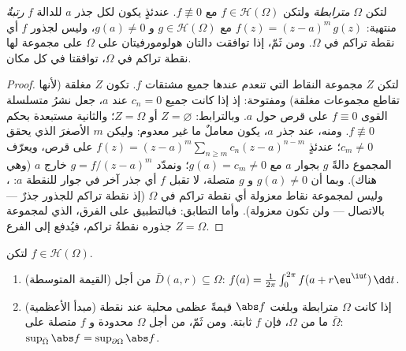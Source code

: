 \begin{theorem}
\label{thm:b3:holomorphic:identity}
لتكن $\Omega$ \emph{مترابطة} ولتكن $f \in \mathcal
H(\Omega)$ مع
$f \not\equiv 0$. عندئذٍ يكون لكل جذر $a$ للدالة $f$
\emph{رتبةٌ} منتهية: $f(z) = (z - a)^m\,g(z)$ مع $g \in
\mathcal H(\Omega)$ و $g(a) \neq 0$، وليس
لجذور $f$ أي نقطة تراكم في $\Omega$. ومن ثَمّ، إذا توافقت
دالتان هولومورفيتان على $\Omega$ على مجموعة لها نقطة تراكم في
$\Omega$، توافقتا في كل مكان.
\end{theorem}

\begin{proof}
لتكن $Z$ مجموعة النقاط التي تنعدم عندها جميع مشتقات $f$. تكون
$Z$ مغلقة (لأنها تقاطع مجموعات مغلقة) ومفتوحة: إذ إذا كانت
جميع $c_n = 0$ عند $a$، جعل نشرُ متسلسلة القوى $f
\equiv 0$ على قرص
حول $a$. وبالترابط: $Z =
\varnothing$ أو $Z = \Omega$؛ والثانية مستبعدة
بحكم $f
\not\equiv 0$. ومنه، عند جذر $a$، يكون معاملٌ ما غير معدوم:
وليكن $m$ الأصغرَ الذي يحقق $c_m \neq 0$؛ عندئذٍ $f(z) = (z -
a)^m\sum_{n\geq m}c_n(z-a)^{n-m}$ على
قرص، ويعرّف المجموع دالةً $g$  بجوار $a$ مع $g(a) = c_m \neq 0$؛
ونمدّد $g = f/(z-a)^m$ خارج $a$ (وهي  هناك). وبما أن
$g(a) \neq 0$ و $g$ متصلة، لا تقبل $f$ أي جذر آخر في جوار
للنقطة $a$: ، وليس لمجموعة نقاط معزولة أي نقطة
تراكم في $\Omega$ (إذ نقطة تراكم للجذور جذرٌ --- بالاتصال ---
ولن تكون معزولة). وأما التطابق: فبالتطبيق على الفرق، الذي
لمجموعة جذوره نقطةُ تراكم، فيُدفع إلى الفرع $Z = \Omega$.
\end{proof}

\begin{theorem}
\label{thm:b3:holomorphic:maximum}
لتكن $f \in \mathcal H(\Omega)$.
\begin{enumerate}
  \item (القيمة المتوسطة) من أجل $\bar D(a, r) \subseteq \Omega$: $f(a) = \frac1{2\pi}\int_0^{2\pi}f(a +
        r\eu^{\iu t})\,\dd t$.
  \item (مبدأ الأعظمية) إذا كانت $\Omega$ مترابطة وبلغت
        $\abs f$ قيمةً عظمى محلية عند نقطة ما من $\Omega$،
        فإن $f$ ثابتة. ومن ثَمّ، من أجل $\Omega$ محدودة و $f$
        متصلة على $\bar\Omega$: $\sup_{\bar\Omega}\abs f =
        \sup_{\partial\Omega}\abs f$.
\end{enumerate}
\end{theorem}

